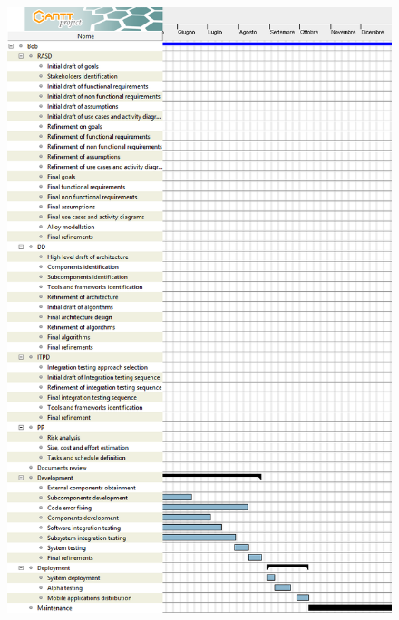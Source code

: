 \begin{figure}[H]
	\centering
	\includegraphics[height=\textheight, keepaspectratio]{resource_allocation/diagrams/ScheduleBob2.png}
\end{figure}